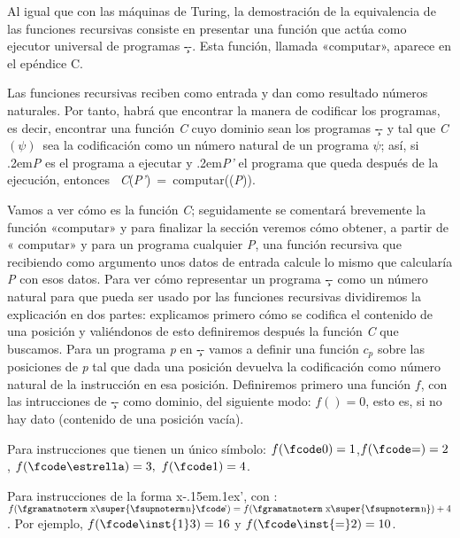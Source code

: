 Al igual que con las máquinas de Turing, la demostración de la equivalencia de las funciones
recursivas consiste en presentar una función que actúa como ejecutor universal de programas \c--.
Esta función, llamada «{\fgabrielen computar}», aparece en el epéndice C.

Las funciones recursivas reciben como entrada y dan como resultado números naturales. Por tanto,
habrá que encontrar la manera de codificar los programas, es decir, encontrar una función {\it C}
cuyo dominio sean los programas \c-- y tal que {\it C$ (\psi) $}\ sea la codificación
como un número natural de un programa $ \psi $; así, si \kern.2em{\it P\/} es el programa
a ejecutar y \kern.2em{\it P'\/} el programa que queda después de la ejecución, entonces \hbox{{\it
C}({\it P'}) = {\fgabrielen computar}(({\it P}))}.

Vamos a ver cómo es la función {\it C}; seguidamente se comentará brevemente la función
«{\fgabrielen computar}» y para finalizar la sección veremos cómo obtener, a partir de «{\fgabrielen
computar}» y para un programa cualquier {\it P}, una función recursiva que recibiendo como argumento
unos datos de entrada calcule lo mismo que calcularía {\it P} con esos datos.
Para ver cómo representar un programa \c-- como un número natural para que pueda ser usado por las
funciones recursivas dividiremos la explicación en dos partes: explicamos primero cómo se codifica
el contenido de una posición y valiéndonos de esto definiremos después la función {\it C} que
buscamos.
Para un programa {\it p} en \c-- vamos a definir una función $ c_p $ sobre las posiciones de {\it p}
tal que dada una posición devuelva la codificación como número natural de la instrucción en esa
posición. Definiremos primero una función $ f $, con las intrucciones de \c-- como dominio, del
siguiente modo:
\listanormal
$ f()= 0$, esto es, si no hay dato (contenido de una posición vacía).

Para instrucciones que tienen un único símbolo:
\espacioej$ f(\hbox{\fcode0})= 1$,\hskip22pt$ f(\hbox{\fcode=})=2 $,\hskip22pt $
f(\hbox{\fcode\estrella})=3, $\hskip22pt $ f(\hbox{\fcode1})=4 $.

Para instrucciones de la forma {\fgramatnoterm x\fcode\kern-.15em\lower.1ex\hbox{’}}, con \nnat:
\espacioej$ f(\hbox{{\fgramatnoterm x\super{\fsupnoterm\kern.1em n}%
\fcode\kern-.15em\lower.1ex\hbox{’}}}) =f(\hbox{{\fgramatnoterm x\super{\fsupnoterm\kern.1em n}}})+4 $.
\finlista
Por ejemplo, $ f(\hbox{{\fcode\inst{1}3}})=16 $ y $ f(\hbox{{\fcode\inst{=}2}})=10 $.

